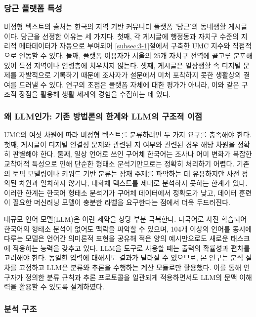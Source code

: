 \subsubsection{당근 플랫폼 특성}
\label{subsubsec:3-3-1}

비정형 텍스트의 출처는 한국의 지역 기반 커뮤니티 플랫폼 '당근'의 동네생활 게시글이다. 당근을 선정한 이유는 세 가지다. 첫째, 각 게시글에 행정동과 자치구 수준의 지리적 메타데이터가 자동으로 부여되어 \ref{subsec:3-1}절에서 구축한 UMC 지수와 직접적으로 연동할 수 있다. 둘째, 플랫폼 이용자가 서울의 25개 자치구 전역에 골고루 분포해 있어 특정 지역이나 연령층에 치우치지 않는다. 셋째, 게시글은 일상생활 속 디지털 문제를 자발적으로 기록하기 때문에 조사자가 설문에서 미처 포착하지 못한 생활상의 결여를 드러낼 수 있다. 연구의 초점은 플랫폼 자체에 대한 평가가 아니라, 이와 같은 구조적 장점을 활용해 생활 세계의 경험을 수집하는 데 있다.

\subsubsection{왜 LLM인가: 기존 방법론의 한계와 LLM의 구조적 이점}
\label{subsubsec:3-3-2}

UMC의 여섯 차원에 따라 비정형 텍스트를 분류하려면 두 가지 요구를 충족해야 한다. 첫째, 게시글이 디지털 연결성 문제와 관련된 지 여부와 관련된 경우 해당 차원을 정확히 판별해야 한다. 둘째, 일상 언어로 쓰인 구어체 한국어는 조사나 어미 변화가 복잡한 교착어적 특성으로 인해 단순한 형태소 분석기만으로는 정확히 처리하기 어렵다. 기존의 토픽 모델링이나 키워드 기반 분류는 잠재 주제를 파악하는 데 유용하지만 사전 정의된 차원과 일치하지 않거나, 대화체 텍스트를 제대로 분석하지 못하는 한계가 있다. 이러한 한계는 한국어 형태소 분석기가 구어체 데이터에서 정확도가 낮고, 데이터 훈련이 필요한 머신러닝 모델이 충분한 라벨을 요구한다는 점에서 더욱 두드러진다.

대규모 언어 모델(LLM)은 이런 제약을 상당 부분 극복한다. 다국어로 사전 학습되어 한국어의 형태소 분석이 없어도 맥락을 파악할 수 있으며, 104개 이상의 언어를 동시에 다루는 모델은 언어간 의미론적 표현을 공유해 적은 양의 예시만으로도 새로운 태스크에 적응하는 능력을 갖추고 있다. LLM을 도구로 사용할 때는 출력의 확률성과 편차를 고려해야 한다. 동일한 입력에 대해서도 결과가 달라질 수 있으므로, 본 연구는 분석 절차를 고정하고 LLM은 분류와 추론을 수행하는 계산 모듈로만 활용했다. 이를 통해 연구자가 정의한 분류 규칙과 추론 프로토콜을 일관되게 적용하면서도 LLM의 문맥 이해력을 활용할 수 있도록 설계하였다.

\subsubsection{분석 구조}
\label{subsubsec:3-3-3}

